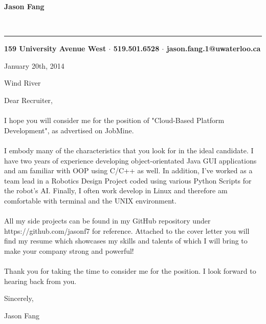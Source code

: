 \documentclass[12pt]{article}
\begin{document}
\pagestyle{empty}
\setlength{\parindent}{10cm}

\begin{center}
\begin{huge}\textbf{Jason Fang}\end{huge}\\
\rule{475pt}{1pt}
\textbf{159 University Avenue West $\cdot$ 519.501.6528 $\cdot$ jason.fang.1@uwaterloo.ca} 
\end{center}


\setlength{\parindent}{0pt}

\vspace{24pt}January 20th, 2014 

Wind River

Dear Recruiter,

\paragraph*{}\hspace{10pt}I hope you will consider me for the position of "Cloud-Based Platform Development", as advertised on JobMine.

\paragraph*{}\hspace{10pt}I embody many of the characteristics that you look for in the ideal candidate. I have two years of experience developing object-orientated Java GUI applications and am familiar with OOP using C/C++ as well. In addition, I've worked as a team lead in a Robotics Design Project coded using various Python Scripts for the robot's AI. Finally, I often work develop in Linux and therefore am comfortable with terminal and the UNIX environment.

\paragraph*{}\hspace{10pt}All my side projects can be found in my GitHub repository under https://github.com/jasonf7 for reference. Attached to the cover letter you will find my resume which showcases my skills and talents of which I will bring to make your company strong and powerful!

\paragraph*{}\hspace{10pt}Thank you for taking the time to consider me for the position. I look forward to hearing back from you.

\vspace{12pt}Sincerely,

\vspace{12pt}Jason Fang
\end{document}

